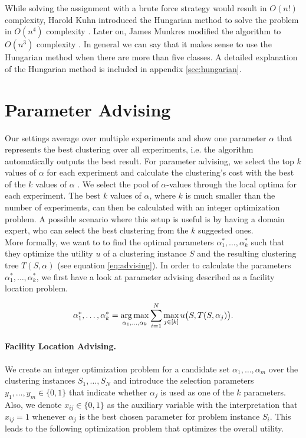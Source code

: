 While solving the assignment with a brute force strategy would result in $O(n!)$ complexity, Harold Kuhn introduced the Hungarian method to solve the problem in $O(n^4)$ complexity \cite{kuhn1955hungarian}. Later on, James Munkres modified the algorithm to $O(n^3)$ complexity \cite{munkres1957algorithms}. In general we can say that it  makes sense to use the Hungarian method when there are more than five classes. A detailed explanation of the Hungarian method is included in appendix \ref{sec:hungarian}.

\section{Parameter Advising}

Our settings average over multiple experiments and show one parameter $\alpha$ that represents the best clustering over all experiments, i.e. the algorithm automatically outputs the best result. For parameter advising, we select the top $k$ values of $\alpha$ for each experiment and calculate the clustering's cost with the best of the $k$ values of $\alpha$ \cite{deblasio2015parameter}. We select the pool of $\alpha$-values through the local optima for each experiment. The best $k$ values of $\alpha$, where $k$ is much smaller than the number of experiments, can then be calculated with an integer optimization problem. A possible scenario where this setup is useful is by having a domain expert, who can select the best clustering from the $k$ suggested ones.\\

More formally, we want to to find the optimal parameters $\alpha_1^*, \dots, \alpha_k^*$ such that they optimize the utility $u$ of a clustering instance $S$ and the resulting clustering tree $T(S, \alpha)$ (see equation \ref{eq:advising}). In order to calculate the parameters $\alpha_1^*, \dots, \alpha_k^*$, we first have a look at parameter advising described as a facility location problem.

\begin{equation}
  \alpha_1^*, \dots, \alpha_k^*
  = \operatorname*{arg\,max}_{\alpha_1, \dots, \alpha_k} \sum_{i=1}^N \max_{j \in [k]} u\bigl(S, T(S, \alpha_j)\bigr).
  \label{eq:advising}
\end{equation}

\paragraph{Facility Location Advising.} We create an integer optimization problem for a candidate set $\alpha_1, \dots, \alpha_m$ over the clustering instances $S_1, \dots, S_N$ and introduce the selection parameters $y_1, \dots, y_m \in \{0, 1\}$ that indicate whether $\alpha_j$ is used as one of the $k$ parameters. Also, we denote $x_{ij} \in \{0, 1\}$ as the auxiliary variable with the interpretation that $x_{ij} = 1$ whenever $\alpha_j$ is the best chosen parameter for problem instance $S_i$. This leads to the following optimization problem that optimizes the overall utility.

